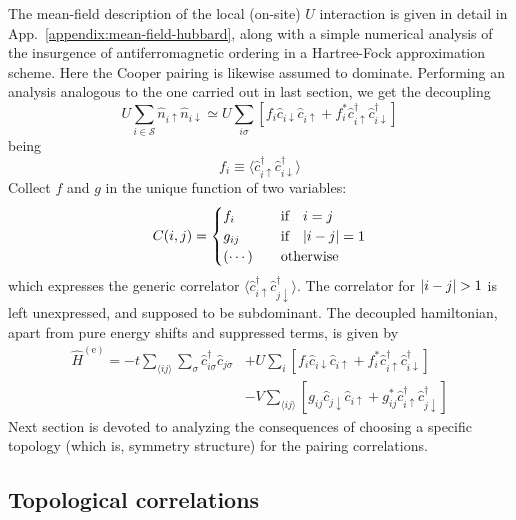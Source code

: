 The mean-field description of the local (on-site) $U$ interaction is given in detail in App.~\ref{appendix:mean-field-hubbard}, along with a simple numerical analysis of the insurgence of antiferromagnetic ordering in a Hartree-Fock approximation scheme. Here the Cooper pairing is likewise assumed to dominate. Performing an analysis analogous to the one carried out in last section, we get the decoupling
\[
	U \sum_{i \in \mathcal{S}} \hat n_{i\uparrow} \hat n_{i\downarrow} \simeq U \sum_{i\sigma} \left[
		f_i \hat c_{i\downarrow} \hat c_{i\uparrow} + f_i^* \hat c_{i\uparrow}^\dagger \hat c_{i\downarrow}^\dagger
	\right]
\]
being
\[
	f_i \equiv \langle \hat c_{i\uparrow}^\dagger \hat c_{i\downarrow}^\dagger \rangle
\]
Collect $f$ and $g$ in the unique function of two variables:
\[
	C(i,j) = \begin{cases}
		f_i &\qq{if} i=j \\
		g_{ij} &\qq{if} \abs{i-j}=1 \\
		(\cdots) &\qq{otherwise}
	\end{cases}
\]
which expresses the generic correlator $\langle \hat c_{i\uparrow}^\dagger \hat c_{j\downarrow}^\dagger \rangle$. The correlator for $\abs{i-j}>1$ is left unexpressed, and supposed to be subdominant. The decoupled hamiltonian, apart from pure energy shifts and suppressed terms, is given by
\begin{align}
	\hat H^{(\mathrm{e})} =
	-t \sum_{\langle ij \rangle} \sum_\sigma \hat c_{i\sigma}^\dagger \hat c_{j\sigma}
	&+ U \sum_i \left[
	f_i \hat c_{i\downarrow} \hat c_{i\uparrow} + f_i^* \hat c_{i\uparrow}^\dagger \hat c_{i\downarrow}^\dagger
	\right] \nonumber \\
	&- V \sum_{\langle ij \rangle} \left[
	g_{ij} \hat c_{j\downarrow} \hat c_{i\uparrow} + g_{ij}^* \hat c_{i\uparrow}^\dagger \hat c_{j\downarrow}^\dagger
	\right] \label{eq:extended-hubbard-model-effective}
\end{align}
Next section is devoted to analyzing the consequences of choosing a specific topology (which is, symmetry structure) for the pairing correlations.

\subsection{Topological correlations}

